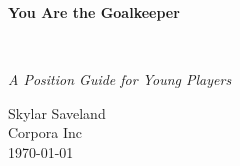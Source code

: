 
\clearpage
\vspace*{1.5in}
\begin{center}
  \begin{minipage}{\textwidth}
    \centering
    \Huge\bfseries
    \linespread{1.25}\selectfont
  You Are the Goalkeeper
  \end{minipage}
  \\[3em]
  {\Large\itshape\linespread{1.3}\selectfont
  A Position Guide for Young Players\par}
  \vfill
  {\large Skylar Saveland}
  \\[1em]
  {\large Corpora Inc}
  \\[1em]
  {\large \today}
\end{center}
\clearpage
